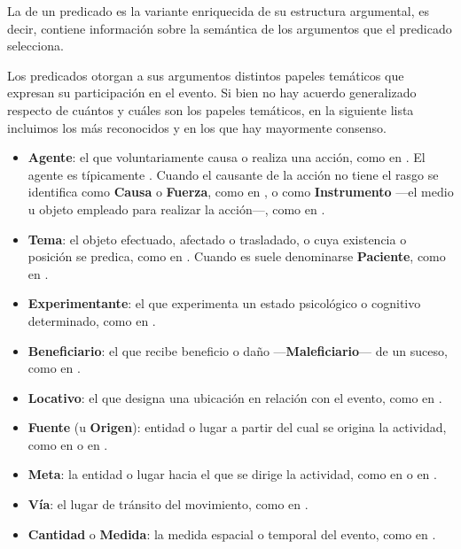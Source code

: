 La  de un predicado es la variante enriquecida de
su estructura argumental, es decir, contiene información sobre la semántica de
los argumentos que el predicado selecciona.

Los predicados otorgan a sus argumentos distintos papeles temáticos que expresan
su participación en el evento. Si bien no hay acuerdo generalizado respecto de
cuántos y cuáles son los papeles temáticos, en la siguiente lista incluimos los
más reconocidos y en los que hay mayormente consenso.

\begin{itemize}
  \item \textbf{Agente}: el que voluntariamente causa o realiza una acción, como
         en . El agente es típicamente
        . Cuando el causante de la acción no tiene el rasgo
         se identifica como \textbf{Causa} o \textbf{Fuerza}, como
         en , o como
        \textbf{Instrumento} ---el medio u objeto empleado para realizar la
        acción---, como  en .
  \item \textbf{Tema}: el objeto efectuado, afectado o trasladado, o cuya
        existencia o posición se predica, como  en . Cuando es  suele denominarse
        \textbf{Paciente}, como  en .
  \item \textbf{Experimentante}: el que experimenta un estado psicológico o
        cognitivo determinado, como  en .
  \item \textbf{Beneficiario}: el que recibe beneficio o daño
        ---\textbf{Maleficiario}--- de un suceso, como  en
        .
  \item \textbf{Locativo}: el que designa una ubicación en relación con el
        evento, como  en .
  \item \textbf{Fuente} (u \textbf{Origen}): entidad o lugar a partir del cual se
        origina la actividad, como  en  o  en .
  \item \textbf{Meta}: la entidad o lugar hacia el que se dirige la actividad,
        como  en  o
         en .
  \item \textbf{Vía}: el lugar de tránsito del movimiento, como  en .
  \item \textbf{Cantidad} o \textbf{Medida}: la medida espacial o temporal del
        evento, como  en .
\end{itemize}

